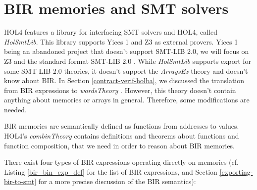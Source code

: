 \documentclass{kththesis}
\begin{document}
{

\section{BIR memories and SMT solvers} \label{bir-memories-with-smt-solvers}


HOL4 features a library for interfacing \gls{SMT} solvers and HOL4, called \textit{HolSmtLib}. This library supports Yices 1 and Z3 as external provers. Yices 1 being an abandoned project that doesn't support SMT-LIB 2.0, we will focus on Z3 and the standard format SMT-LIB 2.0 \cite{barrett_satisfiability_2016}. While \textit{HolSmtLib} supports export for some SMT-LIB 2.0 theories, it doesn't support the \textit{ArraysEx} theory and doesn't know about BIR. In Section \ref{contract-verif-holba}, we discussed the translation from BIR expressions to \textit{wordsTheory} \footnotemark. However, this theory doesn't contain anything about memories or arrays in general. Therefore, some modifications are needed.


BIR memories are semantically defined as functions from addresses to values. HOL4's \textit{combinTheory} contains definitions and theorems about functions and function composition, that we need in order to reason about BIR memories.

There exist four types of BIR expressions operating directly on memories (cf. Listing \ref{bir_bin_exp_def} for the list of BIR expressions, and Section \ref{exporting-bir-to-smt} for a more precise discussion of the BIR semantics):

}
\end{document}
